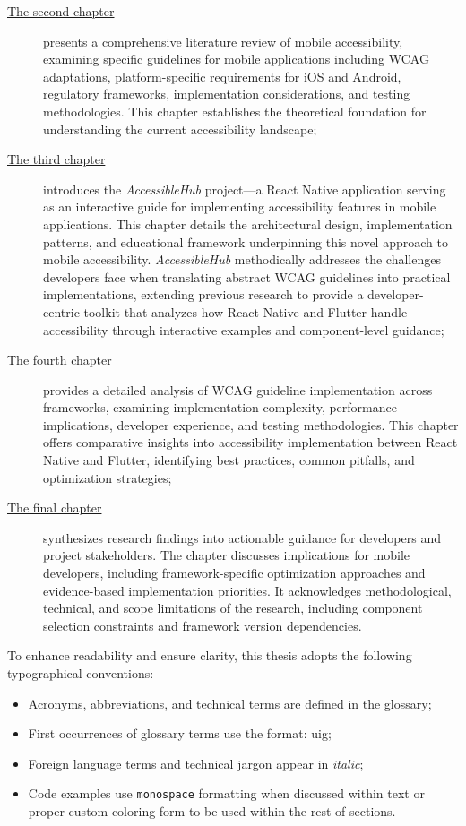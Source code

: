 \begin{description}
    \item[{\hyperref[chap:accessibility]{The second chapter}}] presents a comprehensive literature review of mobile accessibility, examining specific guidelines for mobile applications including WCAG adaptations, platform-specific requirements for iOS and Android, regulatory frameworks, implementation considerations, and testing methodologies. This chapter establishes the theoretical foundation for understanding the current accessibility landscape;
    
    \item[{\hyperref[chap:accessibility-toolkit]{The third chapter}}] introduces the \textit{AccessibleHub} project—a React Native application serving as an interactive guide for implementing accessibility features in mobile applications. This chapter details the architectural design, implementation patterns, and educational framework underpinning this novel approach to mobile accessibility. \textit{AccessibleHub} methodically addresses the challenges developers face when translating abstract WCAG guidelines into practical implementations, extending previous research to provide a developer-centric toolkit that analyzes how React Native and Flutter handle accessibility through interactive examples and component-level guidance;
    
    \item[{\hyperref[chap:accessibility-implementation]{The fourth chapter}}] provides a detailed analysis of WCAG guideline implementation across frameworks, examining implementation complexity, performance implications, developer experience, and testing methodologies. This chapter offers comparative insights into accessibility implementation between React Native and Flutter, identifying best practices, common pitfalls, and optimization strategies;
    
    \item[{\hyperref[chap:conclusions]{The final chapter}}] synthesizes research findings into actionable guidance for developers and project stakeholders. The chapter discusses implications for mobile developers, including framework-specific optimization approaches and evidence-based implementation priorities. It acknowledges methodological, technical, and scope limitations of the research, including component selection constraints and framework version dependencies.
\end{description}

To enhance readability and ensure clarity, this thesis adopts the following typographical conventions:
\begin{itemize}
    \item Acronyms, abbreviations, and technical terms are defined in the glossary;
    \item First occurrences of glossary terms use the format: \gls{uig};
    \item Foreign language terms and technical jargon appear in \textit{italic};
    \item Code examples use \texttt{monospace} formatting when discussed within text or proper custom coloring form to be used within the rest of sections.
\end{itemize}

\newpage
